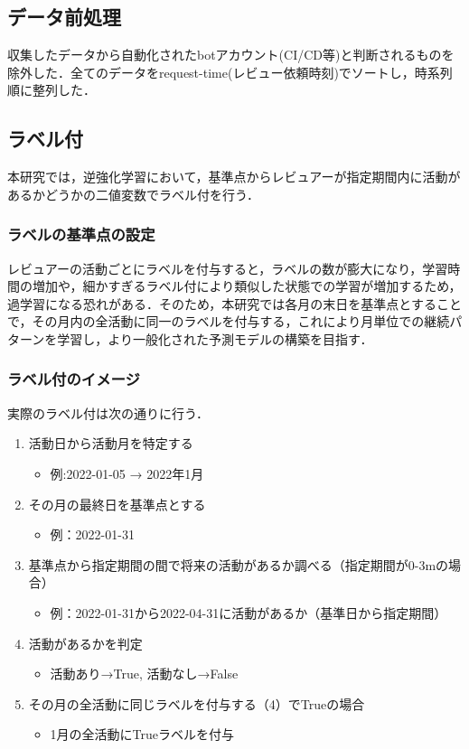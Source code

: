 \documentclass[submit,techrep,noauthor]{ipsj}
\begin{document}
\subsection{データ前処理}
収集したデータから自動化されたbotアカウント(CI/CD等)と判断されるものを除外した．全てのデータをrequest-time(レビュー依頼時刻)でソートし，時系列順に整列した．


\subsection{ラベル付}
本研究では，逆強化学習において，基準点からレビュアーが指定期間内に活動があるかどうかの二値変数でラベル付を行う．
\subsubsection{ラベルの基準点の設定}
レビュアーの活動ごとにラベルを付与すると，ラベルの数が膨大になり，学習時間の増加や，細かすぎるラベル付により類似した状態での学習が増加するため，過学習になる恐れがある．そのため，本研究では各月の末日を基準点とすることで，その月内の全活動に同一のラベルを付与する，これにより月単位での継続パターンを学習し，より一般化された予測モデルの構築を目指す．
\subsubsection{ラベル付のイメージ}
実際のラベル付は次の通りに行う．
\begin{enumerate}
    \item 活動日から活動月を特定する
    \begin{itemize}
        \item 例:2022-01-05 → 2022年1月
    \end{itemize}
    \item その月の最終日を基準点とする
    \begin{itemize}
        \item 例：2022-01-31
    \end{itemize}
    \item 基準点から指定期間の間で将来の活動があるか調べる（指定期間が0-3mの場合）
    \begin{itemize}
        \item 例：2022-01-31から2022-04-31に活動があるか（基準日から指定期間）
    \end{itemize}
    \item 活動があるかを判定
    \begin{itemize}
        \item 活動あり→True, 活動なし→False
    \end{itemize}
        \item その月の全活動に同じラベルを付与する（4）でTrueの場合
    \begin{itemize}
        \item 1月の全活動にTrueラベルを付与
    \end{itemize}
\end{enumerate}
\end{document}
